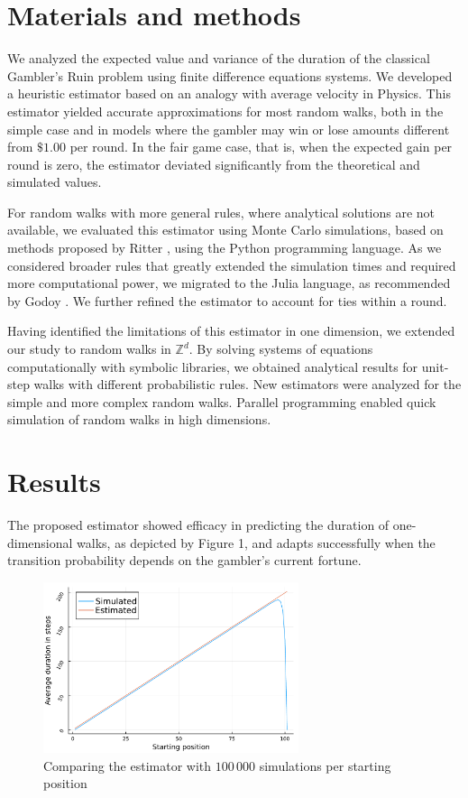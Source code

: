 \documentclass[a4paper,10pt,twocolumn]{article}
\begin{document}
\section{Materials and methods}

We analyzed the expected value and variance of the duration
of the classical Gambler’s Ruin problem \cite{andel_variance_2012} using
finite difference equations systems. We developed a heuristic
estimator based on an analogy with average velocity in Physics. This estimator yielded
accurate approximations for most random walks, both in the simple case and in
models where the gambler may win or lose amounts different from
$\$1.00$ per round. In the fair game case, that is, when the expected gain
per round is zero, the estimator deviated significantly from the theoretical and
simulated values.

For random walks with more general rules, where analytical solutions are not
available, we evaluated this estimator using Monte Carlo simulations, based on
methods proposed by Ritter \cite{ritter_determining_2011}, using the Python
programming language. As we considered broader rules that greatly
extended the simulation times and required more computational power, we
migrated to the Julia language, as recommended by Godoy
\cite{godoy_evaluating_2023}. We further refined the estimator to account for
ties within a round.

Having identified the limitations of this estimator in one dimension, we extended
our study to random walks in $\mathbb{Z}^d$. By solving systems of equations
computationally with symbolic libraries, we obtained analytical results for unit-step
walks with different probabilistic rules. New estimators were analyzed
for the simple and more complex random walks. Parallel programming enabled quick
simulation of random walks in high dimensions.

\section{Results}

The proposed estimator showed efficacy in predicting the duration of
one-dimensional walks, as depicted by Figure 1, and adapts successfully
when the transition probability depends on the gambler's current fortune.

\begin{figure}[H]
    \centering
    \includegraphics[width=7.5cm]{"graficoest-en.pdf"}
    \centering
    \caption{Comparing the estimator with $100\, 000$ simulations per starting
    position}
\end{figure}
\end{document}
